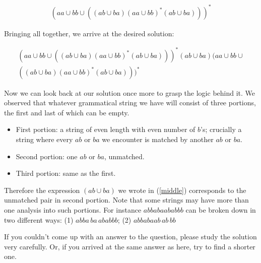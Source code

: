 \documentclass[11pt]{article}
\begin{document}
\begin{itemize}
\begin{enumerate}
\begin{align}
(aa \cup bb \cup ((ab \cup ba)(aa\cup bb)^* (ab\cup ba)))^*
\end{align}


Bringing all together, we arrive at the desired solution:

\begin{align}
(aa \cup bb \cup ((ab \cup ba)(aa\cup bb)^* (ab\cup ba)))^*(ab \cup ba)(aa \cup
bb \cup \\ ((ab \cup ba)(aa\cup bb)^* (ab\cup ba)))^* \nonumber
\end{align}


Now we can look back at our solution once more to grasp the logic behind it. We
observed that whatever grammatical string we have will consist of three
portions, the first and last of which can be empty.

\begin{itemize}
\item[]First portion: a string of even length with even number of $b$'s;
crucially a string where every $ab$ or $ba$ we encounter is matched by another
$ab$ or $ba$.
\item[] Second portion: one $ab$ or $ba$, unmatched.
\item[] Third portion: same as the first.
\end{itemize}


Therefore the expression $(ab \cup ba)$ we wrote in (\ref{middle}) corresponds
to the unmatched pair in second portion. Note that some strings may have more
than one analysis into such portions. For instance $abbabaababbb$ can be
broken down in two different ways: (1) $abba\, ba\, ababbb$; (2) $abbabaab\,
ab\, bb$

If you couldn't come up with an answer to the question, please study the
solution very carefully. Or, if you arrived at the same answer as here, try to
find a shorter one.

\end{enumerate}
\end{itemize}
\end{document}
